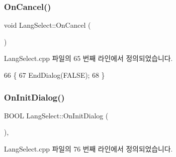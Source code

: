 \subsubsection{\texorpdfstring{On\+Cancel()}{OnCancel()}}
{\footnotesize\ttfamily void Lang\+Select\+::\+On\+Cancel (\begin{DoxyParamCaption}{ }\end{DoxyParamCaption})\hspace{0.3cm}{\ttfamily [protected]}}



Lang\+Select.\+cpp 파일의 65 번째 라인에서 정의되었습니다.


\begin{DoxyCode}
66 \{
67   EndDialog(FALSE);
68 \}
\end{DoxyCode}
\mbox{\label{class_lang_select_ab98f0d9a2302d971a9430c921fc52f8b}} 
\subsubsection{\texorpdfstring{On\+Init\+Dialog()}{OnInitDialog()}}
{\footnotesize\ttfamily B\+O\+OL Lang\+Select\+::\+On\+Init\+Dialog (\begin{DoxyParamCaption}{ }\end{DoxyParamCaption})\hspace{0.3cm}{\ttfamily [protected]}, {\ttfamily [virtual]}}



Lang\+Select.\+cpp 파일의 76 번째 라인에서 정의되었습니다.


